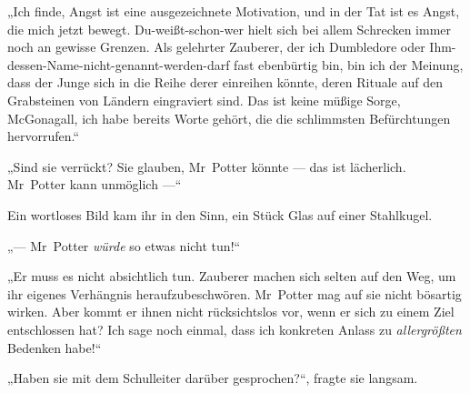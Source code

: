„Ich finde, Angst ist eine ausgezeichnete Motivation, und in der Tat ist es Angst, die mich jetzt bewegt. Du-weißt-schon-wer hielt sich bei allem Schrecken immer noch an gewisse Grenzen. Als gelehrter Zauberer, der ich Dumbledore oder Ihm-dessen-Name-nicht-genannt-werden-darf fast ebenbürtig bin, bin ich der Meinung, dass der Junge sich in die Reihe derer einreihen könnte, deren Rituale auf den Grabsteinen von Ländern eingraviert sind. Das ist keine müßige Sorge, McGonagall, ich habe bereits Worte gehört, die die schlimmsten Befürchtungen hervorrufen.“

„Sind sie verrückt? Sie glauben, Mr~Potter könnte — das ist lächerlich. Mr~Potter kann unmöglich —“

Ein wortloses Bild kam ihr in den Sinn, ein Stück Glas auf einer Stahlkugel.

„— Mr~Potter \emph{würde} so etwas nicht tun!“

„Er muss es nicht absichtlich tun. Zauberer machen sich selten auf den Weg, um ihr eigenes Verhängnis heraufzubeschwören. Mr~Potter mag auf sie nicht bösartig wirken. Aber kommt er ihnen nicht rücksichtslos vor, wenn er sich zu einem Ziel entschlossen hat? Ich sage noch einmal, dass ich konkreten Anlass zu \emph{allergrößten} Bedenken habe!“

„Haben sie mit dem Schulleiter darüber gesprochen?“, fragte sie langsam.

